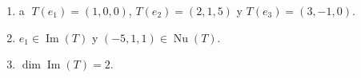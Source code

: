 \begin{enumerate}[topsep=6pt, itemsep=.4cm]
\begin{enumerate}[ topsep=5pt,itemsep=5pt]
        \item\label{usar Txyz} \textcircled{a} $T(e_1)=(1,0,0)$, $T(e_2)=(2,1,5)$ y $T(e_3)=(3,-1,0)$.
        
        \item $e_1\in\operatorname{Im}(T)$ y $(-5,1,1)\in\operatorname{Nu}(T)$.
        
        \item $\operatorname{dim} \operatorname{Im}(T)=2$.
    \end{enumerate}
    
    \rta
        
    \end{enumerate}